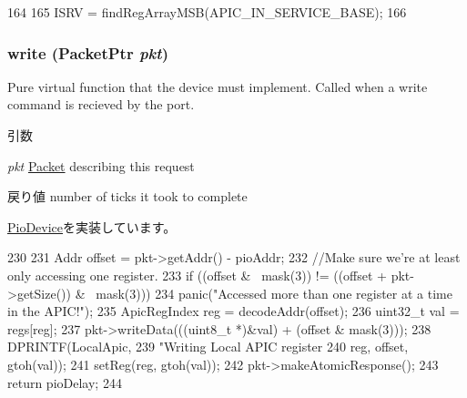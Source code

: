\begin{DoxyCode}
164     {
165         ISRV = findRegArrayMSB(APIC_IN_SERVICE_BASE);
166     }
\end{DoxyCode}
\hypertarget{classX86ISA_1_1Interrupts_a4cefab464e72b5dd42c003a0a4341802}{
\subsubsection[{write}]{ write ({\bf PacketPtr} {\em pkt})}}
\label{classX86ISA_1_1Interrupts_a4cefab464e72b5dd42c003a0a4341802}
Pure virtual function that the device must implement. Called when a write command is recieved by the port. 
\begin{DoxyParams}{引数}
\item[{\em pkt}]\hyperlink{classPacket}{Packet} describing this request \end{DoxyParams}
\begin{DoxyReturn}{戻り値}
number of ticks it took to complete 
\end{DoxyReturn}


\hyperlink{classPioDevice_afe8371668d023bb2516b286e5e399b6f}{PioDevice}を実装しています。


\begin{DoxyCode}
230 {
231     Addr offset = pkt->getAddr() - pioAddr;
232     //Make sure we're at least only accessing one register.
233     if ((offset & ~mask(3)) != ((offset + pkt->getSize()) & ~mask(3)))
234         panic("Accessed more than one register at a time in the APIC!\n");
235     ApicRegIndex reg = decodeAddr(offset);
236     uint32_t val = regs[reg];
237     pkt->writeData(((uint8_t *)&val) + (offset & mask(3)));
238     DPRINTF(LocalApic,
239             "Writing Local APIC register %
240             reg, offset, gtoh(val));
241     setReg(reg, gtoh(val));
242     pkt->makeAtomicResponse();
243     return pioDelay;
244 }
\end{DoxyCode}


